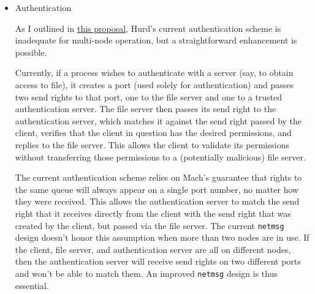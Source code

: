 \documentclass{article}
\def\libpager{{\tt libpager}\xspace}
\def\netmsg{{\tt netmsg}\xspace}
\begin{document}
\begin{itemize}
\begin{itemize}
\item distributed filesystem

Once we have the ability to run processes using distributed
shared memory and distributed scheduling, we should enhance our file
system translators to support replicated copies of files.  This
suggests the need for a...

\item distributed \libpager

We could use a shim process on remote nodes, to allow requests for an
existing page go to a node that holds a copy of that page, instead of
to the node with the disk.  Two ways I can imagine this.  Either
ext2fs forks off multiple processes on different nodes, or a mechanism
is developed to detect when a port is remote, figure out which node it
(currently) resides on, and then \libpager can fork a process and push
it to the other node, invisible to ext2fs proper.

\end{itemize}

\item Authentication

As I outlined in
\href{http://lists.gnu.org/archive/html/bug-hurd/2016-09/msg00012.html}{this
  proposal}, Hurd's current authentication scheme is inadequate for
multi-node operation, but a straightforward enhancement is possible.

Currently, if a process wishes to authenticate with a server (say, to
obtain access to file), it creates a port (used solely for
authentication) and passes two send rights to that port, one to the
file server and one to a trusted authentication server.  The file
server then passes its send right to the authentication server, which
matches it against the send right passed by the client, verifies that
the client in question has the desired permissions, and replies to the
file server.  This allows the client to validate its permissions
without transferring those permissions to a (potentially malicious)
file server.

The current authentication scheme relies on Mach's guarantee that
rights to the same queue will always appear on a single port number,
no matter how they were received.  This allows the authentication
server to match the send right that it receives directly from the
client with the send right that was created by the client, but passed
via the file server.  The current \netmsg design doesn't honor this
assumption when more than two nodes are in use.  If the client, file
server, and authentication server are all on different nodes, then the
authentication server will receive send rights on two different ports
and won't be able to match them.  An improved \netmsg design is
thus essential.


\end{itemize}
\end{document}
